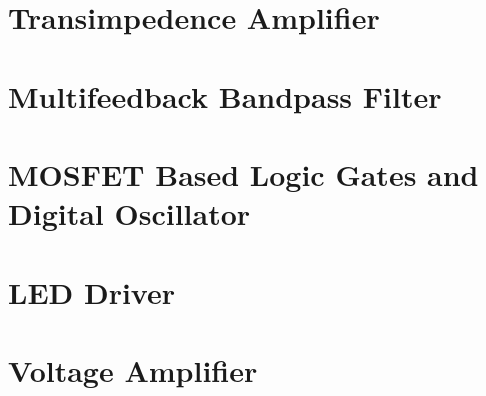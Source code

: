 \documentclass{article}
\begin{document}
\begin{appendices}

\section{Transimpedence Amplifier}
	

\section{Multifeedback Bandpass Filter}
	

\section{MOSFET Based Logic Gates and Digital Oscillator}


\section{LED Driver}
	

\section{Voltage Amplifier}
		



\end{appendices}
\end{document}
